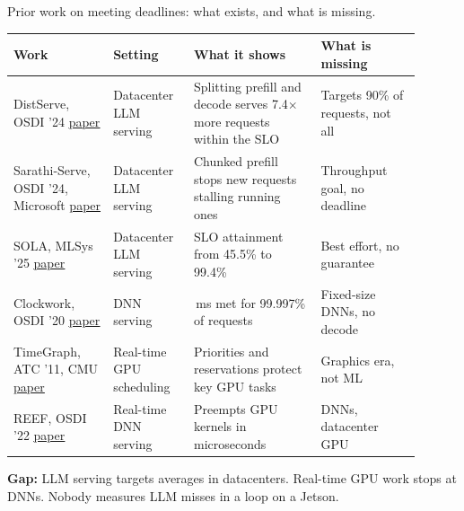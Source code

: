 \documentclass[11pt,aspectratio=43]{beamer}
\begin{document}
\begin{frame}[label=priortable]{Prior work on meeting deadlines: what exists, and what is missing.}

\begin{center}
\scriptsize
\raggedright
\renewcommand{\arraystretch}{1.45}
\setlength{\aboverulesep}{0pt}
\setlength{\belowrulesep}{0pt}
\begin{tabular}{>{\raggedright\arraybackslash}p{0.22\linewidth}|>{\raggedright\arraybackslash}p{0.17\linewidth}|>{\raggedright\arraybackslash}p{0.29\linewidth}|>{\raggedright\arraybackslash}p{0.22\linewidth}}
\toprule
\textbf{Work} & \textbf{Setting} & \textbf{What it shows} & \textbf{What is missing} \\
\midrule
DistServe, OSDI '24 \href{https://www.usenix.org/conference/osdi24/presentation/zhong-yinmin}{\underline{paper}} & Datacenter LLM serving & Splitting prefill and decode serves 7.4$\times$ more requests within the SLO & Targets 90\% of requests, not all \\
Sarathi-Serve, OSDI '24, Microsoft \href{https://www.usenix.org/conference/osdi24/presentation/agrawal}{\underline{paper}} & Datacenter LLM serving & Chunked prefill stops new requests stalling running ones & Throughput goal, no deadline \\
SOLA, MLSys '25 \href{https://mlsys.org/virtual/2025/3345}{\underline{paper}} & Datacenter LLM serving & SLO attainment from 45.5\% to 99.4\% & Best effort, no guarantee \\
Clockwork, OSDI '20 \href{https://www.usenix.org/conference/osdi20/presentation/gujarati}{\underline{paper}} & DNN serving & 100\,ms met for 99.997\% of requests & Fixed-size DNNs, no decode \\
TimeGraph, ATC '11, CMU \href{https://www.usenix.org/conference/usenixatc11/timegraph-gpu-scheduling-real-time-multi-tasking-environments}{\underline{paper}} & Real-time GPU scheduling & Priorities and reservations protect key GPU tasks & Graphics era, not ML \\
REEF, OSDI '22 \href{https://www.usenix.org/conference/osdi22/presentation/han}{\underline{paper}} & Real-time DNN serving & Preempts GPU kernels in microseconds & DNNs, datacenter GPU \\
\bottomrule
\end{tabular}
\end{center}

\vspace{0.2em}
\small
\textbf{Gap:} LLM serving targets averages in datacenters. Real-time GPU work stops at DNNs. Nobody measures LLM misses in a loop on a Jetson.

\end{frame}
\end{document}
